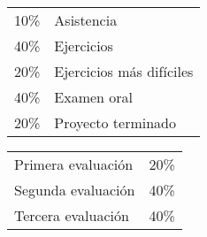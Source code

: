 \documentclass[12pt]{article}
\begin{document}
\par
\noindent
\begin{tabular}{rl}
10\%&Asistencia\\
40\%&Ejercicios\\
20\%&Ejercicios m\'as dif\'iciles\\
40\%&Examen oral\\
20\%&Proyecto terminado
\end{tabular}\par
{}\par
\noindent
\begin{tabular}{ll}
Primera evaluaci\'on&20\%\\
Segunda evaluaci\'on&40\%\\
Tercera evaluaci\'on&40\%
\end{tabular}
\end{document}
